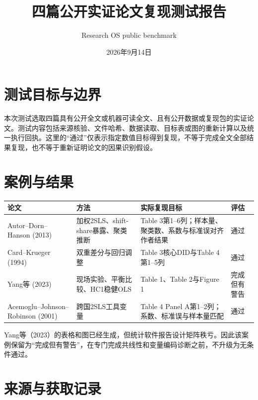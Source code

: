 \documentclass[UTF8,11pt]{ctexart}
\title{四篇公开实证论文复现测试报告}
\author{Research OS public benchmark}
\date{2026年9月14日}
\begin{document}
\maketitle

\section{测试目标与边界}

本次测试选取四篇具有公开全文或机器可读全文、且有公开数据或复现包的实证论文。测试内容包括来源核验、文件哈希、数据读取、目标表或图的重新计算以及统一执行回执。这里的“通过”仅表示指定数值目标得到复现，不等于完成全文全部结果复现，也不等于重新证明论文的因果识别假设。

\section{案例与结果}

\begin{tabularx}{\textwidth}{>{\raggedright\arraybackslash}p{2.5cm}>{\raggedright\arraybackslash}p{3.2cm}>{\raggedright\arraybackslash}X>{\raggedright\arraybackslash}p{2.3cm}}
\toprule
论文 & 方法 & 实际复现目标 & 评估 \\
\midrule
Autor--Dorn--Hanson (2013) & 加权2SLS、shift-share暴露、聚类推断 & Table 3第1--6列；样本量、聚类数、系数与标准误对齐作者结果 & 通过 \\
Card--Krueger (1994) & 双重差分与回归调整 & Table 3核心DID与Table 4第1--5列 & 通过 \\
Yang等 (2023) & 现场实验、平衡比较、HC1稳健OLS & Table 1、Table 2与Figure 1 & 完成但有警告 \\
Acemoglu--Johnson--Robinson (2001) & 跨国2SLS工具变量 & Table 4 Panel A第1--2列；系数、标准误与样本量匹配 & 通过 \\
\bottomrule
\end{tabularx}

Yang等（2023）的表格和图已经生成，但统计软件报告设计矩阵秩亏。因此该案例保留为“完成但有警告”，在专门完成共线性和变量编码诊断之前，不升级为无条件通过。

\section{来源与获取记录}
\end{document}
